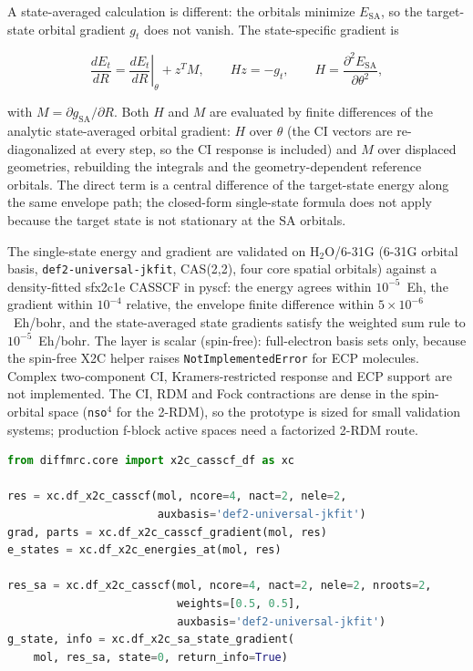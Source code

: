A state-averaged calculation is different: the orbitals minimize
$E_{\mathrm{SA}}$, so the target-state orbital gradient $g_t$ does not
vanish.  The state-specific gradient is

\begin{equation}
  \frac{dE_t}{dR} = \left.\frac{dE_t}{dR}\right|_{\theta}
    + z^{T} M, \qquad H z = -g_t,
    \qquad H = \frac{\partial^2 E_{\mathrm{SA}}}{\partial\theta^{2}},
  \label{eq:new-x2c-sa}
\end{equation}

with $M = \partial g_{\mathrm{SA}}/\partial R$.  Both $H$ and $M$ are
evaluated by finite differences of the analytic state-averaged orbital
gradient: $H$ over $\theta$ (the CI vectors are re-diagonalized at every
step, so the CI response is included) and $M$ over displaced
geometries, rebuilding the integrals and the geometry-dependent
reference orbitals.  The direct term is a central difference of the
target-state energy along the same envelope path; the closed-form
single-state formula does not apply because the target state is not
stationary at the SA orbitals.

The single-state energy and gradient are validated on H$_2$O/6-31G
(6-31G orbital basis, \texttt{def2-universal-jkfit}, CAS(2,2), four
core spatial orbitals) against a density-fitted sfx2c1e CASSCF in
pyscf: the energy agrees within $10^{-5}$~Eh, the gradient within
$10^{-4}$ relative, the envelope finite difference within
$5\times10^{-6}$~Eh/bohr, and the state-averaged state gradients
satisfy the weighted sum rule to $10^{-5}$~Eh/bohr.  The layer is
scalar (spin-free): full-electron basis sets only, because the spin-free
X2C helper raises \texttt{NotImplementedError} for ECP molecules.
Complex two-component CI, Kramers-restricted response and ECP support
are not implemented.  The CI, RDM and Fock contractions are dense in
the spin-orbital space (\texttt{nso}$^{4}$ for the 2-RDM), so the
prototype is sized for small validation systems; production f-block
active spaces need a factorized 2-RDM route.

\begin{lstlisting}[language=Python]
from diffmrc.core import x2c_casscf_df as xc

res = xc.df_x2c_casscf(mol, ncore=4, nact=2, nele=2,
                       auxbasis='def2-universal-jkfit')
grad, parts = xc.df_x2c_casscf_gradient(mol, res)
e_states = xc.df_x2c_energies_at(mol, res)

res_sa = xc.df_x2c_casscf(mol, ncore=4, nact=2, nele=2, nroots=2,
                          weights=[0.5, 0.5],
                          auxbasis='def2-universal-jkfit')
g_state, info = xc.df_x2c_sa_state_gradient(
    mol, res_sa, state=0, return_info=True)
\end{lstlisting}

